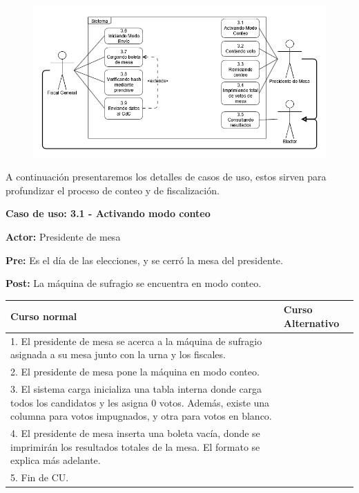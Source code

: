 \begin{figure}[h!]
\centering
\includegraphics[scale=0.5]{imagenes/CU/casosdeusoconteo}
\end{figure}			

A continuación presentaremos los detalles de casos de uso, estos sirven para profundizar el proceso de conteo y de fiscalización.


\textbf{Caso de uso: 3.1 - Activando modo conteo}

\textbf{Actor:} Presidente de mesa

\textbf{Pre:} Es el día de las elecciones, y se cerró la mesa del presidente.

\textbf{Post:} La máquina de sufragio se encuentra en modo conteo.

\begin{table}[h!]
	
 \begin{tabular}{|p{7.5cm} | p{7.5cm}|} 
 \hline
 \textbf{Curso normal} & \textbf{Curso Alternativo} \\
 \hline


1. El presidente de mesa se acerca a la máquina de sufragio asignada a su mesa junto con la urna y los fiscales. & \\
\hline

2. El presidente de mesa pone la máquina en modo conteo. & \\
\hline

3. El sistema carga inicializa una tabla interna donde carga todos los candidatos y les asigna 0 votos. Además, existe una columna para votos impugnados, y otra para votos en blanco. & \\
\hline

4. El presidente de mesa inserta una boleta vacía, donde se imprimirán los resultados totales de la mesa. El formato se explica más adelante. & \\
\hline

5. Fin de CU. & \\
\hline

\end{tabular}
\end{table}


